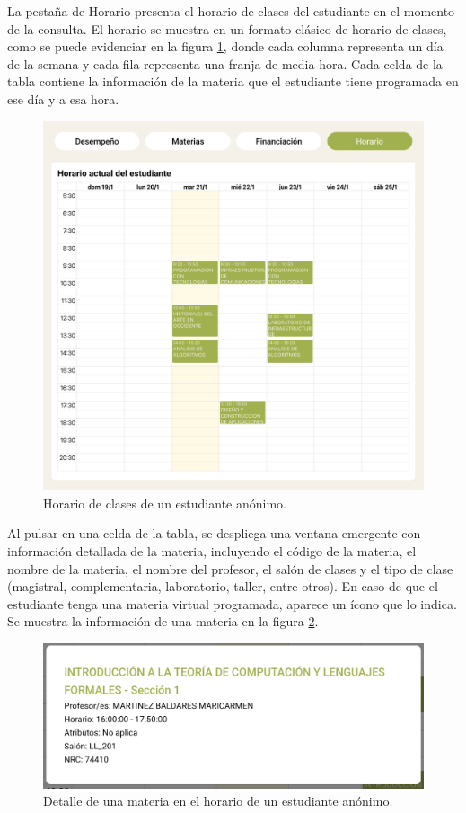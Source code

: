 La pestaña de Horario presenta el horario de clases del estudiante en el momento de la consulta. El horario se muestra en un formato clásico de horario de clases, como se puede evidenciar en la figura \ref{fig:horario}, donde cada columna representa un día de la semana y cada fila representa una franja de media hora. Cada celda de la tabla contiene la información de la materia que el estudiante tiene programada en ese día y a esa hora.

\begin{figure}[H]
	\includegraphics[width=\textwidth]{assets/nes/horario.png}
	\caption{Horario de clases de un estudiante anónimo.}
	\label{fig:horario}
\end{figure}

Al pulsar en una celda de la tabla, se despliega una ventana emergente con información detallada de la materia, incluyendo el código de la materia, el nombre de la materia, el nombre del profesor, el salón de clases y el tipo de clase (magistral, complementaria, laboratorio, taller, entre otros). En caso de que el estudiante tenga una materia virtual programada, aparece un ícono que lo indica. Se muestra la información de una materia en la figura \ref{fig:detalle_horario}.

\begin{figure}[H]
	\includegraphics[width=\textwidth]{assets/nes/detalle_horario.png}
	\caption{Detalle de una materia en el horario de un estudiante anónimo.}
	\label{fig:detalle_horario}
\end{figure}

